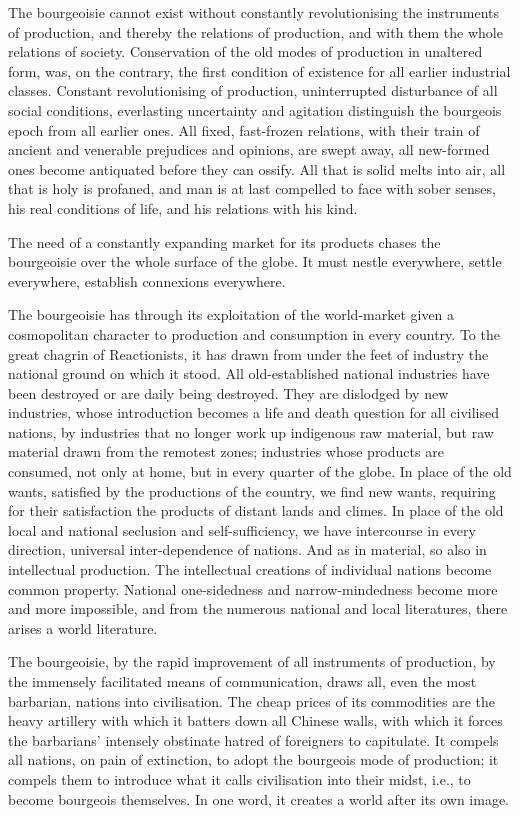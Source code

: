 \documentclass[, oneside]{article}   	%
\begin{document}
The bourgeoisie cannot exist without constantly revolutionising the instruments of production, and thereby the relations of production, and with them the whole relations of society. Conservation of the old modes of production in unaltered form, was, on the contrary, the first condition of existence for all earlier industrial classes. Constant revolutionising of production, uninterrupted disturbance of all social conditions, everlasting uncertainty and agitation distinguish the bourgeois epoch from all earlier ones. All fixed, fast-frozen relations, with their train of ancient and venerable prejudices and opinions, are swept away, all new-formed ones become antiquated before they can ossify. All that is solid melts into air, all that is holy is profaned, and man is at last compelled to face with sober senses, his real conditions of life, and his relations with his kind.

The need of a constantly expanding market for its products chases the bourgeoisie over the whole surface of the globe. It must nestle everywhere, settle everywhere, establish connexions everywhere.

The bourgeoisie has through its exploitation of the world-market given a cosmopolitan character to production and consumption in every country. To the great chagrin of Reactionists, it has drawn from under the feet of industry the national ground on which it stood. All old-established national industries have been destroyed or are daily being destroyed. They are dislodged by new industries, whose introduction becomes a life and death question for all civilised nations, by industries that no longer work up indigenous raw material, but raw material drawn from the remotest zones; industries whose products are consumed, not only at home, but in every quarter of the globe. In place of the old wants, satisfied by the productions of the country, we find new wants, requiring for their satisfaction the products of distant lands and climes. In place of the old local and national seclusion and self-sufficiency, we have intercourse in every direction, universal inter-dependence of nations. And as in material, so also in intellectual production. The intellectual creations of individual nations become common property. National one-sidedness and narrow-mindedness become more and more impossible, and from the numerous national and local literatures, there arises a world literature.

The bourgeoisie, by the rapid improvement of all instruments of production, by the immensely facilitated means of communication, draws all, even the most barbarian, nations into civilisation. The cheap prices of its commodities are the heavy artillery with which it batters down all Chinese walls, with which it forces the barbarians' intensely obstinate hatred of foreigners to capitulate. It compels all nations, on pain of extinction, to adopt the bourgeois mode of production; it compels them to introduce what it calls civilisation into their midst, i.e., to become bourgeois themselves. In one word, it creates a world after its own image.
\end{document}

